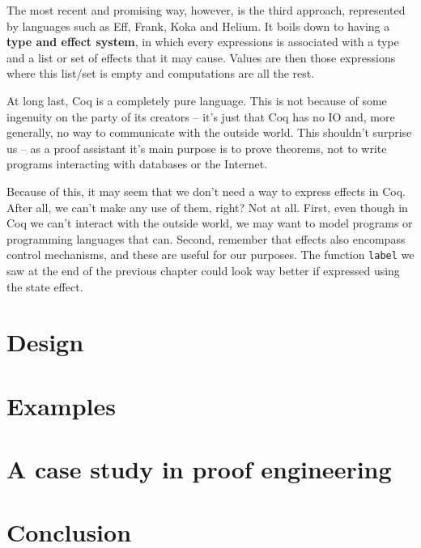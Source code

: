 \documentclass[declaration,inz,english,shortabstract]{iithesis}
\newcommand{\m}[1]{\texttt{#1}}
\begin{document}
The most recent and promising way, however, is the third approach, represented by languages such as Eff, Frank, Koka and Helium. It boils down to having a \textbf{type and effect system}, in which every expressions is associated with a type and a list or set of effects that it may cause. Values are then those expressions where this list/set is empty and computations are all the rest. 

At long last, Coq is a completely pure language. This is not because of some ingenuity on the party of its creators -- it's just that Coq has no IO and, more generally, no way to communicate with the outside world. This shouldn't surprise us -- as a proof assistant it's main purpose is to prove theorems, not to write programs interacting with databases or the Internet.

Because of this, it may seem that we don't need a way to express effects in Coq. After all, we can't make any use of them, right? Not at all. First, even though in Coq we can't interact with the outside world, we may want to model programs or programming languages that can. Second, remember that effects also encompass control mechanisms, and these are useful for our purposes. The function \m{label} we saw at the end of the previous chapter could look way better if expressed using the state effect.
\chapter{Design}

\chapter{Examples}

\chapter{A case study in proof engineering}

\chapter{Conclusion}

\end{document}
